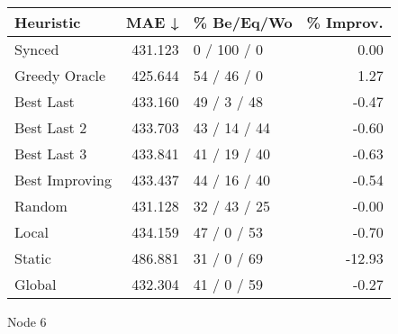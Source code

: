 \begin{tabular}{lrlr}
\toprule
\textbf{Heuristic} & \textbf{MAE ↓} & \textbf{\% Be/Eq/Wo} & \textbf{\% Improv.} \\
\midrule
            Synced &        431.123 &          0 / 100 / 0 &                0.00 \\
     Greedy Oracle &        425.644 &          54 / 46 / 0 &                1.27 \\
         Best Last &        433.160 &          49 / 3 / 48 &               -0.47 \\
       Best Last 2 &        433.703 &         43 / 14 / 44 &               -0.60 \\
       Best Last 3 &        433.841 &         41 / 19 / 40 &               -0.63 \\
    Best Improving &        433.437 &         44 / 16 / 40 &               -0.54 \\
            Random &        431.128 &         32 / 43 / 25 &               -0.00 \\
             Local &        434.159 &          47 / 0 / 53 &               -0.70 \\
            Static &        486.881 &          31 / 0 / 69 &              -12.93 \\
            Global &        432.304 &          41 / 0 / 59 &               -0.27 \\
\bottomrule
\end{tabular}
\caption{Node 6}
\label{tab:non_lr05_le2_bs4_6}
